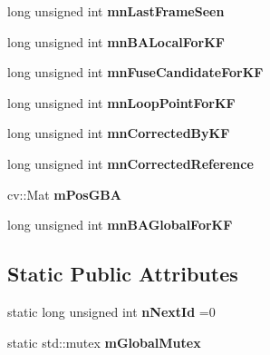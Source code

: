 \begin{DoxyCompactItemize}
long unsigned int {\bfseries mn\+Last\+Frame\+Seen}
\item 
\mbox{\label{classObjectPoint_a0f5d63ec23438d2f1a9f144d6719ff74}} 
long unsigned int {\bfseries mn\+B\+A\+Local\+For\+KF}
\item 
\mbox{\label{classObjectPoint_a25d5689ad67887ffd0eb1b11fe9f9f9a}} 
long unsigned int {\bfseries mn\+Fuse\+Candidate\+For\+KF}
\item 
\mbox{\label{classObjectPoint_ac2d323be3ef5a83685aca8bdd92ec791}} 
long unsigned int {\bfseries mn\+Loop\+Point\+For\+KF}
\item 
\mbox{\label{classObjectPoint_a70bed49e3d5298384dc6ce98c28ecc14}} 
long unsigned int {\bfseries mn\+Corrected\+By\+KF}
\item 
\mbox{\label{classObjectPoint_a8a71b4ace29c1509edc29c1cf1df9a8e}} 
long unsigned int {\bfseries mn\+Corrected\+Reference}
\item 
\mbox{\label{classObjectPoint_ad391907075cbc94b0c000e355226a0f0}} 
cv\+::\+Mat {\bfseries m\+Pos\+G\+BA}
\item 
\mbox{\label{classObjectPoint_af29a1c375295813427d7919cf9938703}} 
long unsigned int {\bfseries mn\+B\+A\+Global\+For\+KF}
\end{DoxyCompactItemize}
\subsection*{Static Public Attributes}
\begin{DoxyCompactItemize}
\item 
\mbox{\label{classObjectPoint_afc638ffc169c7e4788a0939dc1363df9}} 
static long unsigned int {\bfseries n\+Next\+Id} =0
\item 
\mbox{\label{classObjectPoint_a38290a77febdb6f9320d41381f7b949d}} 
static std\+::mutex {\bfseries m\+Global\+Mutex}
\end{DoxyCompactItemize}
